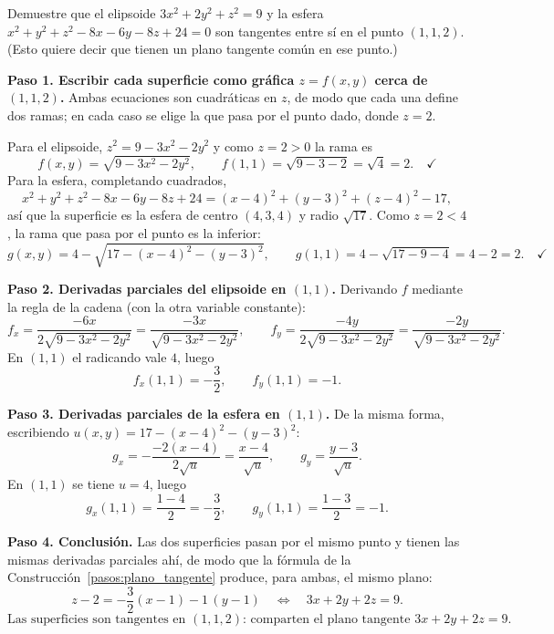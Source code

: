 \begin{prob}
Demuestre que el elipsoide $3x^2+2y^2+z^2=9$ y la esfera $x^2+y^2+z^2-8x-6y-8z+24=0$ son tangentes entre sí en el punto $(1,1,2)$. (Esto quiere decir que tienen un plano tangente común en ese punto.)
\begin{myproof}
\textbf{Paso 1. Escribir cada superficie como gráfica $z=f(x,y)$ cerca de $(1,1,2)$.}
Ambas ecuaciones son cuadráticas en $z$, de modo que cada una define dos ramas; en cada caso se elige la que pasa por el punto dado, donde $z=2$.

Para el elipsoide, $z^2=9-3x^2-2y^2$ y como $z=2>0$ la rama es
\[
f(x,y)=\sqrt{9-3x^2-2y^2},\qquad f(1,1)=\sqrt{9-3-2}=\sqrt{4}=2.\quad\checkmark
\]
Para la esfera, completando cuadrados,
\[
x^2+y^2+z^2-8x-6y-8z+24=(x-4)^2+(y-3)^2+(z-4)^2-17,
\]
así que la superficie es la esfera de centro $(4,3,4)$ y radio $\sqrt{17}$. Como $z=2<4$, la rama que pasa por el punto es la inferior:
\[
g(x,y)=4-\sqrt{17-(x-4)^2-(y-3)^2},\qquad g(1,1)=4-\sqrt{17-9-4}=4-2=2.\quad\checkmark
\]

\textbf{Paso 2. Derivadas parciales del elipsoide en $(1,1)$.}
Derivando $f$ mediante la regla de la cadena (con la otra variable constante):
\[
f_x=\frac{-6x}{2\sqrt{9-3x^2-2y^2}}=\frac{-3x}{\sqrt{9-3x^2-2y^2}},
\qquad
f_y=\frac{-4y}{2\sqrt{9-3x^2-2y^2}}=\frac{-2y}{\sqrt{9-3x^2-2y^2}}.
\]
En $(1,1)$ el radicando vale $4$, luego
\[
f_x(1,1)=-\frac{3}{2},\qquad f_y(1,1)=-1.
\]

\textbf{Paso 3. Derivadas parciales de la esfera en $(1,1)$.}
De la misma forma, escribiendo $u(x,y)=17-(x-4)^2-(y-3)^2$:
\[
g_x=-\frac{-2(x-4)}{2\sqrt{u}}=\frac{x-4}{\sqrt{u}},
\qquad
g_y=\frac{y-3}{\sqrt{u}}.
\]
En $(1,1)$ se tiene $u=4$, luego
\[
g_x(1,1)=\frac{1-4}{2}=-\frac{3}{2},\qquad g_y(1,1)=\frac{1-3}{2}=-1.
\]

\textbf{Paso 4. Conclusión.}
Las dos superficies pasan por el mismo punto y tienen las mismas derivadas parciales ahí, de modo que la fórmula de la Construcción~\ref{pasos:plano_tangente} produce, para ambas, el mismo plano:
\[
z-2=-\frac{3}{2}(x-1)-1\,(y-1)
\quad\Longleftrightarrow\quad
3x+2y+2z=9.
\]
\[
\boxed{\text{Las superficies son tangentes en }(1,1,2)\text{: comparten el plano tangente }3x+2y+2z=9.}
\]
\end{myproof}
\end{prob}

